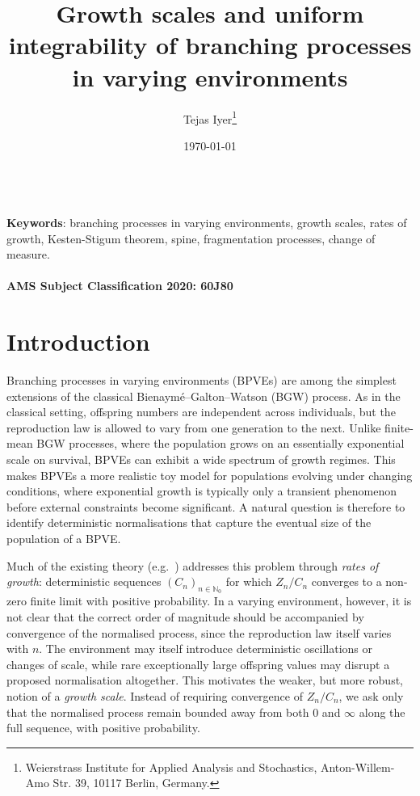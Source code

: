 \documentclass[12pt]{article}
\title{Growth scales and uniform integrability of branching processes in varying environments}
\author{Tejas Iyer\footnote{Weierstrass Institute for Applied Analysis and Stochastics, Anton-Willem-Amo Str. 39, 10117 Berlin, Germany.}}
\date{\today}
\theoremstyle{definition}
\begin{document}
\maketitle
{}

\noindent  \bigskip
\\
{\bf Keywords}: branching processes in varying environments, growth scales, rates of growth, Kesten-Stigum theorem, spine, fragmentation processes, change of measure. 
\\\\
{\bf AMS Subject Classification 2020: 60J80} 


\section{Introduction}

Branching processes in varying environments (BPVEs) are among the simplest extensions of the classical Bienaymé–Galton–Watson (BGW) process. As in the classical setting, offspring numbers are independent across individuals, but the reproduction law is allowed to vary from one generation to the next. Unlike finite-mean BGW processes, where the population grows on an essentially exponential scale on survival, BPVEs can exhibit a wide spectrum of growth regimes. This makes BPVEs a more realistic toy model for populations evolving under changing conditions, where exponential growth is typically only a transient phenomenon before external constraints become significant. A natural question is therefore to identify deterministic normalisations that capture the eventual size of the population of a BPVE.

Much of the existing theory (e.g.~\cite{schuh-barbour-infinite-mean, dsouza-rates-of-growth}) addresses this problem through \emph{rates of growth}: deterministic sequences $(C_n)_{n\in\mathbb{N}_0}$ for which $Z_n/C_n$ converges to a non-zero finite limit with positive probability. In a varying environment, however, it is not clear that the correct order of magnitude should be accompanied by convergence of the normalised process, since the reproduction law itself varies with $n$. The environment may itself introduce deterministic oscillations or changes of scale, while rare exceptionally large offspring values may disrupt a proposed normalisation altogether. This motivates the weaker, but more robust, notion of a \emph{growth scale}. Instead of requiring convergence of $Z_n/C_n$, we ask only that the normalised process remain bounded away from both $0$ and $\infty$ along the full sequence, with positive probability. 
\end{document}
